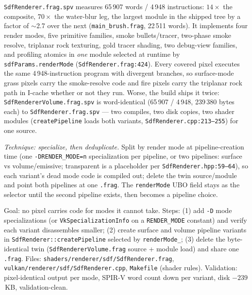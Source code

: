 \documentclass[11pt,a4paper]{article}
\begin{document}
\texttt{SdfRenderer.frag.spv} measures 65\,907 words / 4\,948 instructions:
$14\times$ the composite, $70\times$ the water-blur leg, the largest module
in the shipped tree by a factor of $\sim$2.7 over the next
(\texttt{main\_brush.frag}, 22\,511 words). It implements four render modes,
five primitive families, smoke bullets/tracer, two-phase smoke resolve,
triplanar rock texturing, gold tracer shading, two debug-view families, and
profiling atomics in \emph{one} module selected at runtime by
\texttt{sdfParams.renderMode} (\texttt{SdfRenderer.frag:424}). Every covered
pixel executes the same 4\,948-instruction program with divergent branches,
so surface-mode grass pixels carry the smoke-resolve code and fire pixels
carry the triplanar rock path in I-cache whether or not they run. Worse, the
build ships it twice: \texttt{SdfRendererVolume.frag.spv} is word-identical
(65\,907 / 4\,948, 239\,380 bytes each) to \texttt{SdfRenderer.frag.spv} ---
two compiles, two disk copies, two shader modules
(\texttt{createPipeline} loads both variants, \texttt{SdfRenderer.cpp:213--255})
for one source.

\textit{Technique: specialize, then deduplicate.} Split by render mode at
pipeline-creation time (one \texttt{-DRENDER\_MODE=n} specialization per
pipeline, or two pipelines: surface vs volume/emissive; transparent is a
placeholder per \texttt{SdfRenderer.hpp:59--64}), so each variant's dead mode
code is compiled out; delete the twin source/module and point both pipelines
at one \texttt{.frag}. The \texttt{renderMode} UBO field stays as the
selector until the second pipeline exists, then becomes a pipeline choice.

\begin{tcolorbox}[promptbox={Prompt --- C1: specialized SDF pipelines, one fragment source}]
Goal: no pixel carries code for modes it cannot take. Steps: (1) add
\texttt{-D} mode specializations (or \texttt{VkSpecializationInfo} on a
\texttt{RENDER\_MODE} constant) and verify each variant disassembles smaller;
(2) create surface and volume pipeline variants in
\texttt{SdfRenderer::createPipeline} selected by \texttt{renderMode\_};
(3) delete the byte-identical twin (\texttt{SdfRendererVolume.frag} source +
module load) and share one \texttt{.frag}. Files:
\texttt{shaders/renderer/sdf/SdfRenderer.frag},
\texttt{vulkan/renderer/sdf/SdfRenderer.cpp}, \texttt{Makefile} (shader rules).
Validation: pixel-identical output per mode, SPIR-V word count down per
variant, disk $-239$\,KB, validation-clean.
\end{tcolorbox}
\end{document}
